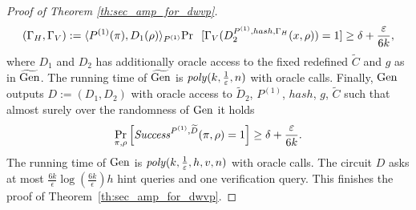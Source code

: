 \begin{proof}[Proof of Theorem \ref{th:sec_amp_for_dwvp}]
\begin{align}
{{{        (\Gamma_H, \Gamma_V) := \langle P^{(1)}(\pi), D_1(\rho) \rangle_{P^{(1)}}}}}
    {\Pr}\mkern13mu[\Gamma_V(D_2^{P^{(1)}, hash, \Gamma_H}(x, \rho)) = 1] \geq \delta + \frac{\epsilon}{6k},
\end{align}
where $D_1$ and $D_2$ has additionally oracle access to the fixed redefined $\widetilde{C}$ and $g$ as in $\widetilde{\Gen}$.
The running time of $\widetilde{\Gen}$ is $\poly(k, \frac{1}{\epsilon}, n)$ with oracle calls.
Finally, $\Gen$ outputs $D := (D_1, D_2)$ with oracle access to $\widetilde{D}_2$, $P^{(1)}$, $hash$, $g$, $\widetilde{C}$ such that almost surely over
the randomness of $\Gen$ it holds
\begin{align*}
    \underset{\pi, \rho}{\Pr}\left[\Success^{P^{(1)},\widetilde{D}}(\pi, \rho) = 1\right] \geq \delta + \frac{\varepsilon}{6k}.
\end{align*}
The running time of $\Gen$ is $\poly(k,\frac{1}{\epsilon},h,v,n)$ with oracle calls.
The circuit $D$ asks at most $\frac{6k}{\epsilon} \log(\frac{6k}{\epsilon})h$ hint queries and one verification query.
This finishes the proof of Theorem~\ref{th:sec_amp_for_dwvp}.
\end{proof}

